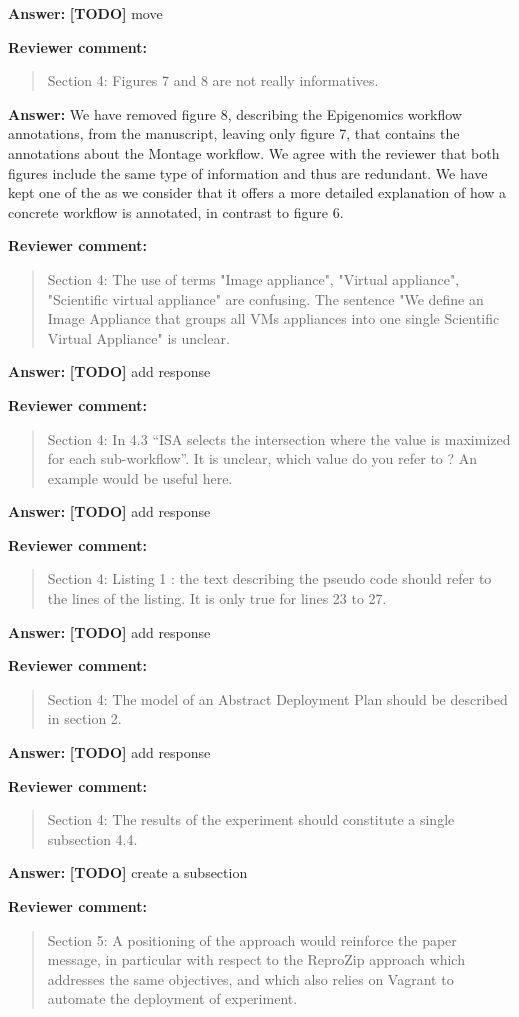 \documentclass{letter}
\newenvironment{review}%
{\textbf{Reviewer comment:}\begin{quote}}%
{\end{quote}}%
\newcommand{\todo}[1]{%
      \color{red}\textbf{[TODO]} #1\color{black}}
\newcommand{\answer}[1]{%
      \textbf{Answer:} #1}
\begin{document}
\begin{letter}{}
\answer{\todo{move}}


\begin{review}
Section 4: Figures 7 and 8 are not really informatives.
\end{review}

\answer{We have removed figure 8, describing the Epigenomics workflow annotations, from the manuscript, leaving only figure 7, that contains the annotations about the Montage workflow. We agree with the reviewer that both figures include the same type of information and thus are redundant. We have kept one of the as we consider that it offers a more detailed explanation of how a concrete workflow is annotated, in contrast to figure 6.}


\begin{review}
Section 4: The use of terms "Image appliance", "Virtual appliance", "Scientific virtual appliance" are confusing. The sentence "We define an Image Appliance that groups all VMs appliances into one single Scientific Virtual Appliance" is unclear.
\end{review}

\answer{\todo{add response}}


\begin{review}
Section 4: In 4.3 ``ISA selects the intersection where the value is maximized for each sub-workflow''. It is unclear, which value do you refer to ? An example would be useful here.
\end{review}

\answer{\todo{add response}}


\begin{review}
Section 4: Listing 1 : the text describing the pseudo code should refer to the lines of the listing. It is only true for lines 23 to 27.
\end{review}

\answer{\todo{add response}}


\begin{review}
Section 4: The model of an Abstract Deployment Plan should be described in section 2.
\end{review}

\answer{\todo{add response}}


\begin{review}
Section 4: The results of the experiment should constitute a single subsection 4.4.
\end{review}

\answer{\todo{create a subsection}}


\begin{review}
Section 5: A positioning of the approach would reinforce the paper message, in particular with respect to the ReproZip approach which addresses the same objectives, and which also relies on Vagrant to automate the deployment of experiment.
\end{review}


\end{letter}
\end{document}
